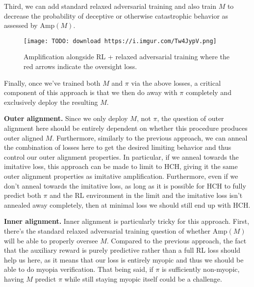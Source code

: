 \documentclass[
  onecolumn,
  natbib,
]{miri-tech-article}
\begin{document}
Third, we can add standard relaxed adversarial training and also train $M$ to decrease the probability of deceptive or otherwise catastrophic behavior as assessed by $\text{Amp}(M)$.

\begin{figure}[h!]
  \centering
  \texttt{[image: TODO: download https://i.imgur.com/Tw4JypV.png]}
  \caption{Amplification alongside RL + relaxed adversarial training where the red arrows indicate the oversight loss.}
\end{figure}

Finally, once we've trained both $M$ and $\pi$ via the above losses, a critical component of this approach is that we then do away with $\pi$ completely and exclusively deploy the resulting $M$.

\textbf{Outer alignment.} Since we only deploy $M$, not $\pi$, the question of outer alignment here should be entirely dependent on whether this procedure produces outer aligned $M$. Furthermore, similarly to the previous approach, we can anneal the combination of losses here to get the desired limiting behavior and thus control our outer alignment properties. In particular, if we anneal towards the imitative loss, this approach can be made to limit to HCH, giving it the same outer alignment properties as imitative amplification. Furthermore, even if we don't anneal towards the imitative loss, as long as it is possible for HCH to fully predict both $\pi$ and the RL environment in the limit and the imitative loss isn't annealed away completely, then at minimal loss we should still end up with HCH.

\textbf{Inner alignment.} Inner alignment is particularly tricky for this approach. First, there's the standard relaxed adversarial training question of whether $\text{Amp}(M)$ will be able to properly oversee $M$. Compared to the previous approach, the fact that the auxiliary reward is purely predictive rather than a full RL loss should help us here, as it means that our loss is entirely myopic and thus we should be able to do myopia verification\cite{TODO: cite https://www.alignmentforum.org/posts/BKM8uQS6QdJPZLqCr/towards-a-mechanistic-understanding-of-corrigibility}. That being said, if $\pi$ is sufficiently non-myopic, having $M$ predict $\pi$ while still staying myopic itself could be a challenge.
\end{document}

